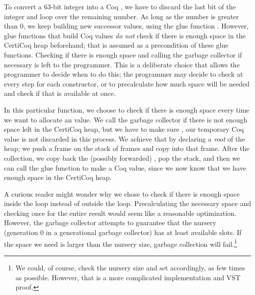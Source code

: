 To convert a 63-bit integer into a Coq , we have to discard the last bit of the integer and loop over the remaining number. As long as the number is greater than $0$, we keep building new successor values, using the glue function . However, glue functions that build Coq values \emph{do not} check if there is enough space in the \gls{CertiCoq heap} beforehand; that is assumed as a precondition of these glue functions. Checking if there is enough space and calling the garbage collector if necessary is left to the programmer. This is a deliberate choice that allows the programmer to decide when to do this; the programmer may decide to check at every step for each constructor, or to precalculate how much space will be needed and check if that is available at once.

In this particular function, we choose to check if there is enough space every time we want to allocate an  value. We call the garbage collector if there is not enough space left in the \gls{CertiCoq heap}, but we have to make sure , our temporary Coq  value is not discarded in this process. We achieve that by 
declaring  a \textit{root} of the
heap; we push a frame on the stack of frames
and copy  into that frame. After the collection,
we copy back the (possibly forwarded) , pop the stack, and then we can call the glue function to make a Coq  value, since we now know that we have enough space in the \gls{CertiCoq heap}.

A curious reader might wonder why we chose to check if there is enough space inside the loop instead of outside the loop. Precalculating the necessary space and checking once for the entire result would seem like a reasonable optimization. However, the garbage collector attempts to guarantee that the nursery (generation $0$ in a generational garbage collector) has at least  available slots. If the space we need is larger than the nursery size, garbage collection will fail.\footnote{We could, of course, check the nursery size and set  accordingly, as few times as possible. However, that is a more complicated implementation and VST proof.}

